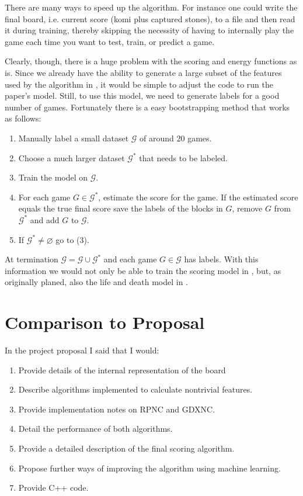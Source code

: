 \documentclass[11pt,letterpaper]{article}
\begin{document}
There are many ways to speed up the algorithm. For instance one could write the final board, i.e. current
score (komi plus captured stones), to a file and then read it during training, thereby skipping the necessity of having
to internally play the game each time you want to test, train, or predict a game.

Clearly, though, there is a huge problem with the scoring and energy functions as is. Since we already have the
ability to generate a large subset of the features used by the algorithm in \cite{WHU:04}, it would be simple to adjust
the code to run the paper's model. Still, to use this model, we need to generate labels for a good number of games.
Fortunately there is a easy bootstrapping method that works as follows:
\begin{enumerate}
  \item Manually label a small dataset $\mathcal{ G }$ of around 20 games.
  \item Choose a much larger dataset $\mathcal{ G }^*$ that needs to be labeled.
  \item Train the model on $\mathcal{ G }$.
  \item For each game $G \in \mathcal{ G }^*$, estimate the score for the game. If the estimated score equals the
    true final score save the labels of the blocks in $G$, remove $G$ from $\mathcal{ G }^*$ and add $G$ to
    $\mathcal{ G }$.
  \item If $\mathcal{ G }^* \neq \varnothing$ go to (3).
\end{enumerate}
At termination $\mathcal{ G } = \mathcal{ G } \cup \mathcal{ G }^*$ and each game $G \in \mathcal{ G }$ has labels.
With this information we would not only be able to train the scoring model in \cite{WHU:04}, but, as originally planed,
also the life and death model in \cite{WWHU:05}.

\section{Comparison to Proposal}

In the project proposal I said that I would:
\begin{enumerate}
  \item Provide details of the internal representation of the board
  \item Describe algorithms implemented to calculate nontrivial features.
  \item Provide implementation notes on RPNC and GDXNC.
  \item Detail the performance of both algorithms.
  \item Provide a detailed description of the final scoring algorithm.
  \item Propose further ways of improving the algorithm using machine learning.
  \item Provide C++ code.
\end{enumerate}
\end{document}
